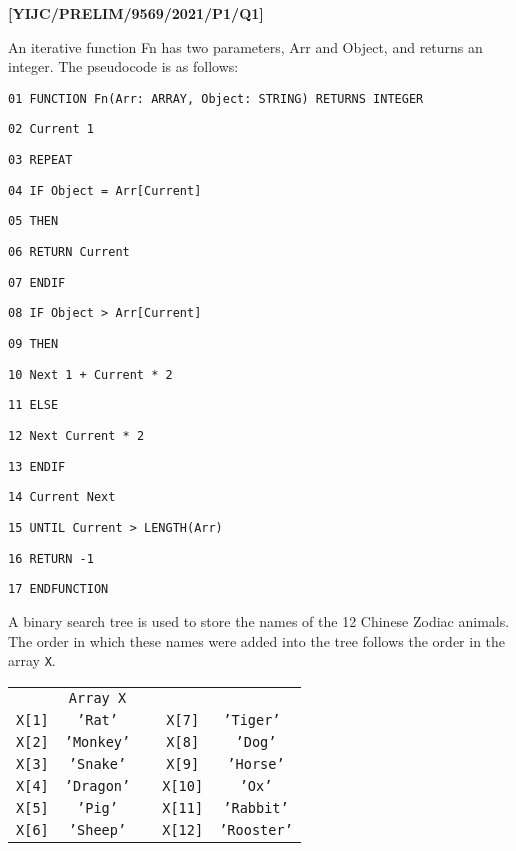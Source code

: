 \item \textbf{{[}YIJC/PRELIM/9569/2021/P1/Q1{]} }

An iterative function Fn has two parameters, Arr and Object, and returns
an integer. The pseudocode is as follows: 

\noindent\begin{minipage}[t]{1\columnwidth}%
\texttt{01 FUNCTION Fn(Arr: ARRAY, Object: STRING) RETURNS INTEGER }

\texttt{02 \qquad{}Current \textleftarrow{} 1 }

\texttt{03 \qquad{}\qquad{}REPEAT }

\texttt{04 \qquad{}\qquad{}\qquad{}IF Object = Arr{[}Current{]} }

\texttt{05 \qquad{}\qquad{}\qquad{}\qquad{}THEN }

\texttt{06 \qquad{}\qquad{}\qquad{}\qquad{}\qquad{}RETURN Current }

\texttt{07 \qquad{}\qquad{}\qquad{}ENDIF }

\texttt{08 \qquad{}\qquad{}\qquad{}IF Object > Arr{[}Current{]} }

\texttt{09 \qquad{}\qquad{}\qquad{}\qquad{}THEN }

\texttt{10 \qquad{}\qquad{}\qquad{}\qquad{}\qquad{}Next \textleftarrow{}
1 + Current {*} 2 }

\texttt{11 \qquad{}\qquad{}\qquad{}\qquad{}ELSE }

\texttt{12 \qquad{}\qquad{}\qquad{}\qquad{}\qquad{}Next \textleftarrow{}
Current {*} 2 }

\texttt{13 \qquad{}\qquad{}\qquad{}ENDIF }

\texttt{14 \qquad{}\qquad{}\qquad{}Current \textleftarrow{} Next }

\texttt{15 \qquad{}UNTIL Current > LENGTH(Arr) }

\texttt{16 \qquad{}RETURN -1 }

\texttt{17 ENDFUNCTION }%
\end{minipage}A binary search tree is used to store the names of the 12 Chinese
Zodiac animals. The order in which these names were added into the
tree follows the order in the array \texttt{X}. 
\noindent \begin{center}
\begin{tabular}{c|c|cc|c|}
\multicolumn{1}{c}{} & \multicolumn{1}{c}{\texttt{Array X}} &  & \multicolumn{1}{c}{} & \multicolumn{1}{c}{}\tabularnewline
\cline{2-2} \cline{5-5} 
\texttt{X{[}1{]}} & \texttt{'Rat'} &  & \texttt{X{[}7{]}} & \texttt{'Tiger' }\tabularnewline
\cline{2-2} \cline{5-5} 
\texttt{X{[}2{]}} & \texttt{'Monkey'} &  & \texttt{X{[}8{]}} & \texttt{'Dog'}\tabularnewline
\cline{2-2} \cline{5-5} 
\texttt{X{[}3{]}} & \texttt{'Snake'} &  & \texttt{X{[}9{]}} & \texttt{'Horse'}\tabularnewline
\cline{2-2} \cline{5-5} 
\texttt{X{[}4{]}} & \texttt{'Dragon'} &  & \texttt{X{[}10{]}} & \texttt{'Ox'}\tabularnewline
\cline{2-2} \cline{5-5} 
\texttt{X{[}5{]}} & \texttt{'Pig'} &  & \texttt{X{[}11{]}} & \texttt{'Rabbit'}\tabularnewline
\cline{2-2} \cline{5-5} 
\texttt{X{[}6{]}} & \texttt{'Sheep'} &  & \texttt{X{[}12{]}} & \texttt{'Rooster'}\tabularnewline
\cline{2-2} \cline{5-5} 
\end{tabular}
\par\end{center}
